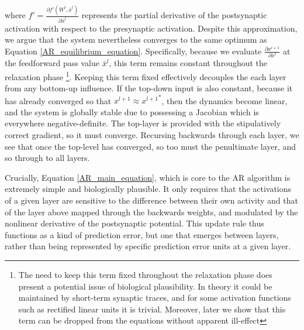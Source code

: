 where $f' = \frac{\partial f'(W^l, \bar{x}^l)}{\partial \bar{x}^l}$ represents the partial derivative of the postsynaptic activation with respect to the presynaptic activation. Despite this approximation, we argue that the system nevertheless converges to the same optimum as Equation \ref{AR_equilibrium_equation}. Specifically, because we evaluate $\frac{\partial x^{l+1}}{\partial x^l}$ at the feedforward pass value $\bar{x}^l$, this term remains constant throughout the relaxation phase \footnote{The need to keep this term fixed throughout the relaxation phase does present a potential issue of biological plausibility. In theory it could be maintained by short-term synaptic traces, and for some activation functions such as rectified linear units it is trivial. Moreover, later we show that this term can be dropped from the equations without apparent ill-effect}. Keeping this term fixed effectively decouples the each layer from any bottom-up influence. If the top-down input is also constant, because it has already converged so that $x^{l+1} \approx {x^{l+1}}^*$, then the dynamics become linear, and the system is globally stable due to possessing a Jacobian which is everywhere negative-definite. The top-layer is provided with the stipulatively correct gradient, so it must converge. Recursing backwards through each layer, we see that once the top-level has converged, so too must the penultimate layer, and so through to all layers.

Crucially, Equation \ref{AR_main_equation}, which is core to the AR algorithm is extremely simple and biologically plausible. It only requires that the activations of a given layer are sensitive to the difference between their own activity and that of the layer above mapped through the backwards weights, and modulated by the nonlinear derivative of the postsynaptic potential. This update rule thus functions as a kind of prediction error, but one that emerges between layers, rather than being represented by specific prediction error units at a given layer.

